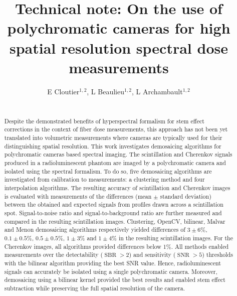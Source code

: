 \documentclass[12pt]{iopart}
\DeclareMathOperator{\SBR}{SBR}
\DeclareMathOperator{\SNR}{SNR}
\begin{document}
\title[Spectral dose imaging]{Technical note: On the use of polychromatic cameras for high spatial resolution spectral dose measurements}


\author{E Cloutier$^{1,2}$, L Beaulieu$^{1,2}$,
L Archambault$^{1,2}$}
\address{$^1$ Service de physique médicale et Axe Oncologie du Centre de recherche, CHU de Québec-Université Laval, Canada}
\address{$^2$ Département de physique, de génie physique et d'optique, et Centre de recherche sur le cancer, Université Laval, Québec, Canada}


\begin{abstract}
\\
    Despite the demonstrated benefits of hyperspectral formalism for stem effect corrections in the context of fiber dose measurements, this approach has not been yet translated into volumetric measurements where cameras are typically used for their distinguishing spatial resolution. This work investigates demosaicing algorithms for polychromatic cameras based spectral imaging. The scintillation and Cherenkov signals produced in a radioluminescent phantom are imaged by a polychromatic camera and isolated using the spectral formalism. To do so, five demosaicing algorithms are investigated from calibration to measurements: a clustering method and four interpolation algorithms. The resulting accuracy of scintillation and Cherenkov images is evaluated with measurements of the differences (mean $\pm$ standard deviation) between the obtained and expected signals from profiles drawn across a scintillation spot. Signal-to-noise ratio and signal-to-background ratio are further measured and compared in the resulting scintillation images. Clustering, OpenCV, bilinear, Malvar and Menon demosaicing algorithms respectively yielded differences of $3\pm6\%$, $0.1\pm0.5\%$, $0.5\pm0.5\%$,  $1\pm3\%$ and $1\pm4\%$ in the resulting scintillation images. For the Cherenkov images, all algorithms provided differences below 1\%. All methods enabled measurements over the detectability ($\SBR>2$) and sensitivity ($\SNR>5$) thresholds with the bilinear algorithm providing the best SNR value. Hence, radioluminescent signals can accurately be isolated using a single polychromatic camera. Moreover, demosaicing using a bilinear kernel provided the best results and enabled stem effect subtraction while preserving the full spatial resolution of the camera.  
    
\end{abstract}
\end{document}
